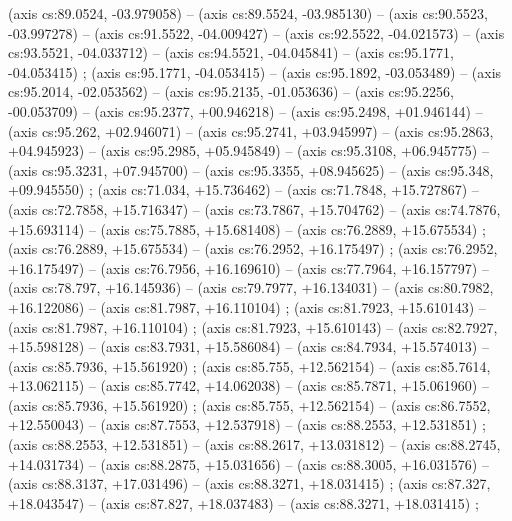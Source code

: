     (axis cs:89.0524,    -03.979058) --  (axis cs:89.5524,    -03.985130) --  (axis cs:90.5523,    -03.997278) --  (axis cs:91.5522,    -04.009427) --  (axis cs:92.5522,    -04.021573) --  (axis cs:93.5521,    -04.033712) --  (axis cs:94.5521,    -04.045841) --  (axis cs:95.1771,    -04.053415) ;
    (axis cs:95.1771,    -04.053415) --  (axis cs:95.1892,    -03.053489) --  (axis cs:95.2014,    -02.053562) --  (axis cs:95.2135,    -01.053636) --  (axis cs:95.2256,    -00.053709) --  (axis cs:95.2377,    +00.946218) --  (axis cs:95.2498,    +01.946144) --  (axis cs:95.262,    +02.946071) --  (axis cs:95.2741,    +03.945997) --  (axis cs:95.2863,    +04.945923) --  (axis cs:95.2985,    +05.945849) --  (axis cs:95.3108,    +06.945775) --  (axis cs:95.3231,    +07.945700) --  (axis cs:95.3355,    +08.945625) --  (axis cs:95.348,    +09.945550) ;
    (axis cs:71.034,    +15.736462) --  (axis cs:71.7848,    +15.727867) --  (axis cs:72.7858,    +15.716347) --  (axis cs:73.7867,    +15.704762) --  (axis cs:74.7876,    +15.693114) --  (axis cs:75.7885,    +15.681408) --  (axis cs:76.2889,    +15.675534) ;
    (axis cs:76.2889,    +15.675534) --  (axis cs:76.2952,    +16.175497) ;
    (axis cs:76.2952,    +16.175497) --  (axis cs:76.7956,    +16.169610) --  (axis cs:77.7964,    +16.157797) --  (axis cs:78.797,    +16.145936) --  (axis cs:79.7977,    +16.134031) --  (axis cs:80.7982,    +16.122086) --  (axis cs:81.7987,    +16.110104) ;
    (axis cs:81.7923,    +15.610143) --  (axis cs:81.7987,    +16.110104) ;
    (axis cs:81.7923,    +15.610143) --  (axis cs:82.7927,    +15.598128) --  (axis cs:83.7931,    +15.586084) --  (axis cs:84.7934,    +15.574013) --  (axis cs:85.7936,    +15.561920) ;
    (axis cs:85.755,    +12.562154) --  (axis cs:85.7614,    +13.062115) --  (axis cs:85.7742,    +14.062038) --  (axis cs:85.7871,    +15.061960) --  (axis cs:85.7936,    +15.561920) ;
    (axis cs:85.755,    +12.562154) --  (axis cs:86.7552,    +12.550043) --  (axis cs:87.7553,    +12.537918) --  (axis cs:88.2553,    +12.531851) ;
    (axis cs:88.2553,    +12.531851) --  (axis cs:88.2617,    +13.031812) --  (axis cs:88.2745,    +14.031734) --  (axis cs:88.2875,    +15.031656) --  (axis cs:88.3005,    +16.031576) --  (axis cs:88.3137,    +17.031496) --  (axis cs:88.3271,    +18.031415) ;
    (axis cs:87.327,    +18.043547) --  (axis cs:87.827,    +18.037483) --  (axis cs:88.3271,    +18.031415) ;
